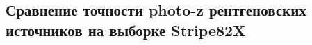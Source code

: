 \documentclass[fleqn,usenatbib]{mnras}
\begin{document}



\clearpage

\subsection{Сравнение точности photo-z рентгеновских источников на выборке Stripe82X}\label{ssec:sota-comp}
\end{document}
